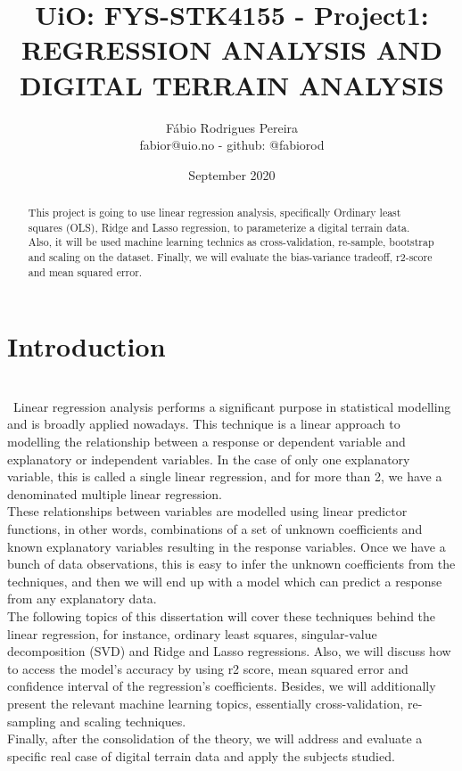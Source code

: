 \documentclass{article}
\title{UiO: FYS-STK4155 - Project1: REGRESSION ANALYSIS AND DIGITAL TERRAIN ANALYSIS}
\author{Fábio Rodrigues Pereira \\ \small fabior@uio.no - github: @fabiorod}
\date{September 2020}
\begin{document}
\maketitle
\begin{abstract}
\noindent This project is going to use linear regression analysis, specifically Ordinary least squares (OLS), Ridge and Lasso regression, to parameterize a digital terrain data. Also, it will be used machine learning technics as cross-validation, re-sample, bootstrap and scaling on the dataset. Finally, we will evaluate the bias-variance tradeoff, r2-score and mean squared error.
\end{abstract}

\section{Introduction}\\

\quad \, Linear regression analysis performs a significant purpose in statistical modelling and is broadly applied nowadays. This technique is a linear approach to modelling the relationship between a response or dependent variable and explanatory or independent variables. In the case of only one explanatory variable, this is called a single linear regression, and for more than 2, we have a denominated multiple linear regression.\\

These relationships between variables are modelled using linear predictor functions, in other words, combinations of a set of unknown coefficients and known explanatory variables resulting in the response variables. Once we have a bunch of data observations, this is easy to infer the unknown coefficients from the techniques, and then we will end up with a model which can predict a response from any explanatory data.\\

The following topics of this dissertation will cover these techniques behind the linear regression, for instance, ordinary least squares, singular-value decomposition (SVD) and Ridge and Lasso regressions. Also, we will discuss how to access the model's accuracy by using r2 score, mean squared error and confidence interval of the regression's coefficients. Besides, we will additionally present the relevant machine learning topics, essentially cross-validation, re-sampling and scaling techniques.\\

Finally, after the consolidation of the theory, we will address and evaluate a specific real case of digital terrain data and apply the subjects studied.\\
\end{document}
